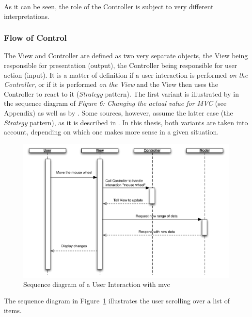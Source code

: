 
As it can be seen, the role of the Controller is subject to very different interpretations.

\subsubsection{Flow of Control}
\label{sec:flowofcontrol}
The View and Controller are defined as two very separate objects, the View being responsible for presentation (output), the Controller being responsible for user action (input). It is a matter of definition if a user interaction is performed \emph{on the Controller}, or if it is performed \emph{on the View} and the View then uses the Controller to react to it (\emph{Strategy} pattern). The first variant is illustrated by  in the sequence diagram of \emph{Figure 6: Changing the actual value for MVC} (see Appendix) as well as by . Some sources, however, assume the latter case (the \emph{Strategy} pattern), as it is described in . In this thesis, both variants are taken into account, depending on which one makes more sense in a given situation.
\begin{figure}[H]
	\centering
	\includegraphics[width=16cm]{images/seqmvc.pdf}
	\caption{Sequence diagram of a User Interaction with \acl{mvc}}
	\label{fig:seqmvc}
\end{figure}
The sequence diagram in Figure~\ref{fig:seqmvc} illustrates the user scrolling over a list of items.

